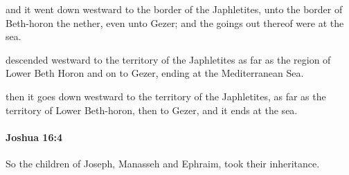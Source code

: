 			\begin{versebox}
					\item[BHS] 
					\item[ASV] and it went down westward to the border of the Japhletites, unto the border of Beth-horon the nether, even unto Gezer; and the goings out thereof were at the sea.
					\item[NIV] descended westward to the territory of the Japhletites as far as the region of Lower Beth Horon and on to Gezer, ending at the Mediterranean Sea.
					\item[NRSV] then it goes down westward to the territory of the Japhletites, as far as the territory of Lower Beth-horon, then to Gezer, and it ends at the sea.
			\end{versebox}

		\paragraph{Joshua 16:4} %
			\label{JOSHUA-16-4}

			So the children of Joseph, Manasseh and Ephraim, took their inheritance.

